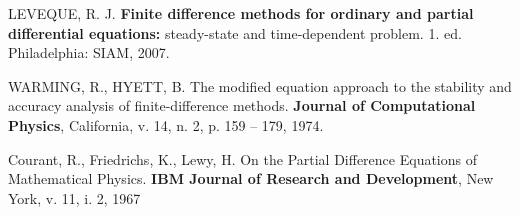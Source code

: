 \documentclass[10pt,twoside,a4paper]{article}
\begin{document}
	\begin{thebibliography}{9} %
		
		LEVEQUE, R. J. \textbf{Finite difference methods for ordinary and partial differential equations:} steady-state and time-dependent problem. 1. ed. Philadelphia: SIAM, 2007.
		
		WARMING, R., HYETT, B. The modified equation approach to the stability and accuracy analysis of finite-difference methods.	\textbf{Journal of Computational Physics}, California, v. 14, n. 2, p. 159 – 179, 1974.
	
			
		Courant, R., Friedrichs, K., Lewy, H. On the Partial Difference Equations
		of Mathematical Physics.   \textbf{IBM Journal of Research and Development}, New York, v. 11, i. 2, 1967 
				
	\end{thebibliography}
	
\end{document}

